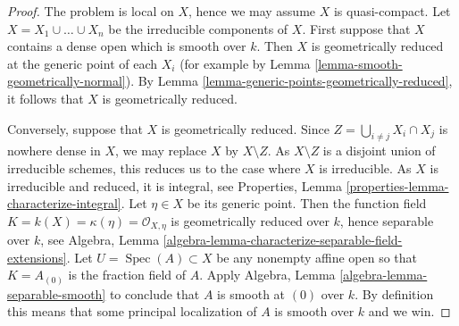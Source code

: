 \documentclass[10pt,a4paper]{amsart}
\theoremstyle{plain}
\theoremstyle{definition}
\theoremstyle{remark}
\numberwithin{equation}{subsection}
\def\Spec{\mathop{\mathrm{Spec}}}
\begin{document}
\begin{proof}
The problem is local on $X$, hence we may assume $X$ is quasi-compact.
Let $X = X_1 \cup \ldots \cup X_n$ be the irreducible components of $X$.
First suppose that $X$ contains a dense open which is smooth over $k$.
Then $X$ is geometrically reduced at the generic point of each $X_i$
(for example by Lemma \ref{lemma-smooth-geometrically-normal}).
By Lemma \ref{lemma-generic-points-geometrically-reduced},
it follows that $X$ is geometrically reduced.

\medskip\noindent
Conversely, suppose that $X$ is geometrically reduced.
Since $Z = \bigcup_{i \not = j} X_i \cap X_j$ is nowhere dense in $X$,
we may replace $X$ by $X \setminus Z$. As $X \setminus Z$ is a
disjoint union of irreducible schemes, this reduces us to the case
where $X$ is irreducible. As $X$ is irreducible and reduced, it is
integral, see
Properties, Lemma \ref{properties-lemma-characterize-integral}.
Let $\eta \in X$ be its generic point.
Then the function field $K = k(X) = \kappa(\eta) = \mathcal{O}_{X, \eta}$
is geometrically reduced over $k$, hence separable over $k$, see
Algebra, Lemma \ref{algebra-lemma-characterize-separable-field-extensions}.
Let $U = \Spec(A) \subset X$ be any nonempty affine open
so that $K = A_{(0)}$ is the fraction field of $A$. Apply
Algebra, Lemma \ref{algebra-lemma-separable-smooth}
to conclude that $A$ is smooth at $(0)$ over $k$.
By definition this means that some principal localization
of $A$ is smooth over $k$ and we win.
\end{proof}
\end{document}
